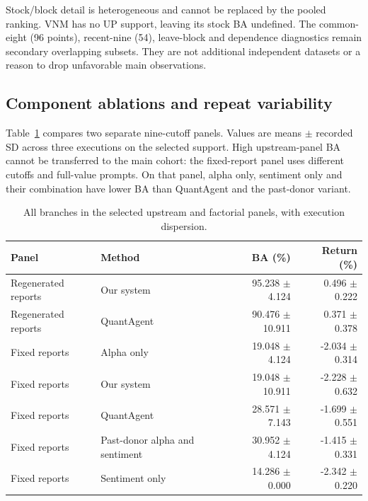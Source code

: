 Stock/block detail is heterogeneous and cannot be replaced by the pooled
ranking. VNM has no UP support, leaving its stock BA undefined. The
common-eight (96 points), recent-nine (54), leave-block and dependence
diagnostics remain secondary overlapping subsets. They are not additional
independent datasets or a reason to drop unfavorable main observations.

\subsection{Component ablations and repeat variability}
Table~\ref{tab:smallpanels} compares two separate nine-cutoff panels.
Values are means $\pm$ recorded SD across three executions on the selected
support. High upstream-panel BA cannot be transferred to the main cohort:
the fixed-report panel uses different cutoffs and full-value prompts. On
that panel, alpha only, sentiment only and their combination have lower BA
than QuantAgent and the past-donor variant.

\begin{table}[!htb]\centering\small{}\setlength{\tabcolsep}{4pt}
\caption[Selected upstream and factorial panels]{All branches in the selected upstream and factorial panels, with execution dispersion.}\label{tab:smallpanels}
\begin{tabular}{@{}l l rr@{}}\toprule
Panel & Method & BA (\%) & Return (\%)\\\midrule
Regenerated reports & Our system & 95.238 \ensuremath{\pm} 4.124 & 0.496 \ensuremath{\pm} 0.222\\
Regenerated reports & QuantAgent & 90.476 \ensuremath{\pm} 10.911 & 0.371 \ensuremath{\pm} 0.378\\
Fixed reports & Alpha only & 19.048 \ensuremath{\pm} 4.124 & -2.034 \ensuremath{\pm} 0.314\\
Fixed reports & Our system & 19.048 \ensuremath{\pm} 10.911 & -2.228 \ensuremath{\pm} 0.632\\
Fixed reports & QuantAgent & 28.571 \ensuremath{\pm} 7.143 & -1.699 \ensuremath{\pm} 0.551\\
Fixed reports & Past-donor alpha and sentiment & 30.952 \ensuremath{\pm} 4.124 & -1.415 \ensuremath{\pm} 0.331\\
Fixed reports & Sentiment only & 14.286 \ensuremath{\pm} 0.000 & -2.342 \ensuremath{\pm} 0.220\\
\bottomrule\end{tabular}\end{table}

